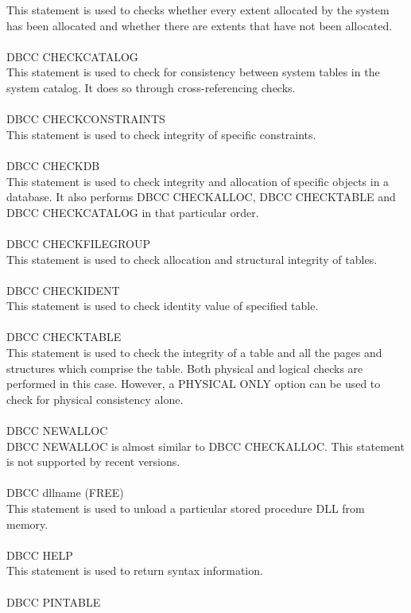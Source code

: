 \documentclass[english]{article}
\begin{document}
This statement is used to checks whether every extent allocated by the system has been allocated and whether there are extents that have not been allocated. 
\\\\ 
DBCC CHECKCATALOG\\
This statement is used to check for consistency between system tables in the system catalog. It does so through cross-referencing checks. 
\\\\ 
DBCC CHECKCONSTRAINTS\\
This statement is used to check integrity of specific constraints. 
\\\\ 
DBCC CHECKDB\\
This statement is used to check integrity and allocation of specific objects in a database. It also performs DBCC CHECKALLOC, DBCC CHECKTABLE and DBCC CHECKCATALOG in that particular order. 
\\\\ 
DBCC CHECKFILEGROUP\\
This statement is used to check allocation and structural integrity of tables.
\\\\ 
DBCC CHECKIDENT\\
This statement is used to check identity value of specified table.
\\\\ 
DBCC CHECKTABLE\\
This statement is used to check the integrity of a table and all the pages and structures which comprise the table. Both physical and logical checks are performed in this case. However, a PHYSICAL ONLY option can be used to check for physical consistency alone. 
\\\\ 
DBCC NEWALLOC
\\
DBCC NEWALLOC is almost similar to DBCC CHECKALLOC. This statement is not supported by recent versions. 
\\\\ 
DBCC dllname (FREE)\\
This statement is used to unload a particular stored procedure DLL from memory. 
\\\\ 
DBCC HELP\\
This statement is used to return syntax information. 
\\\\ 
DBCC PINTABLE\\
\end{document}
